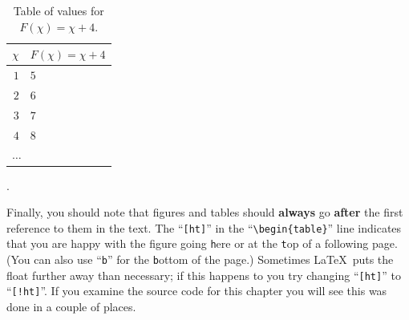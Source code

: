 \def\tallstrut{\vrule width 0pt depth 5.5 pt height 12 pt}

\begin{table}[ht]
    \centering
    \caption{Table of values for $F(\chi)=\chi+4$.}
    \begin{tabular}[ht]{r|l}
	\hline
	\tallstrut $\chi$ & $F(\chi)=\chi+4$\\
	\hline
	$1$ & $5$\\
	$2$ & $6$\\
	$3$ & $7$\\
	$4$ & $8$\\
	\multicolumn{2}{l}{$\ldots$}\\
	\hline
    \end{tabular}
    \label{tab:EQUATION1a_VALUES}.
\end{table}

Finally, you should note that figures and tables should
\textbf{always} go \textbf{after} the first reference to them in the
text.  The ``\verb|[ht]|'' in the ``\verb|\begin{table}|'' line
indicates that you are happy with the figure going \verb|h|ere or at
the \verb|t|op of a following page.  (You can also use ``\verb|b|''
for the \verb|b|ottom of the page.)
Sometimes \LaTeX\ puts the float further away than necessary; if this
happens to you try changing ``\verb|[ht]|'' to  ``\verb|[!ht]|''. 
If you examine the source code for this chapter you will see this was
done in a couple of places.
